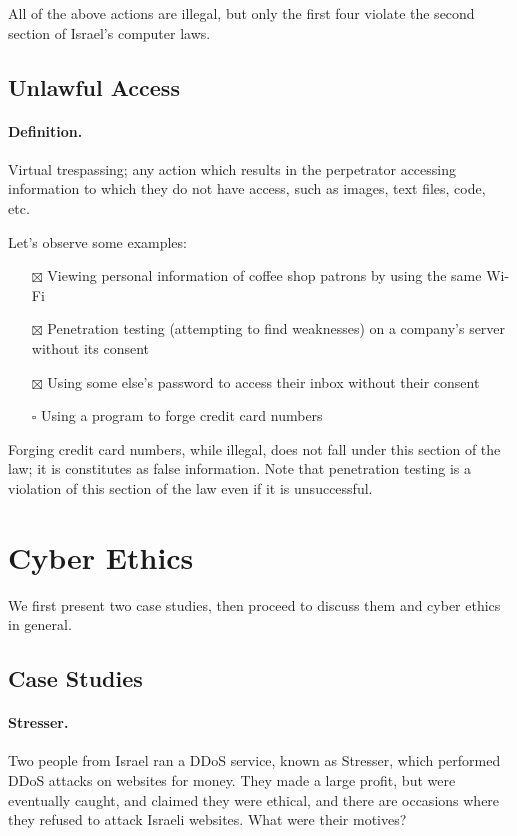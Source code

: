 All of the above actions are illegal, but only the first four violate the second
section of Israel's computer laws.

\subsection{Unlawful Access}

\paragraph{Definition.} Virtual trespassing; any action which results in the
perpetrator accessing information to which they do not have access, such as
images, text files, code, etc.

Let's observe some examples:
\begin{itemize}
    \item[$\boxtimes$] Viewing personal information of coffee shop patrons by
    using the same Wi-Fi
    \item[$\boxtimes$] Penetration testing (attempting to find weaknesses) on a
    company's server without its consent
    \item[$\boxtimes$] Using some else's password to access their inbox without
    their consent
    \item[$\square$] Using a program to forge credit card numbers
\end{itemize}

Forging credit card numbers, while illegal, does not fall under this section of
the law; it is constitutes as false information. Note that penetration testing
is a violation of this section of the law even if it is unsuccessful.

\section{Cyber Ethics}\label{sec:cyber_ethics}

We first present two case studies, then proceed to discuss them and cyber ethics
in general.

\subsection{Case Studies}

\paragraph{Stresser.} Two people from Israel ran a DDoS service, known as
Stresser, which performed DDoS attacks on websites for money. They made a large
profit, but were eventually caught, and claimed they were ethical, and there are
occasions where they refused to attack Israeli websites. What were their
motives?

